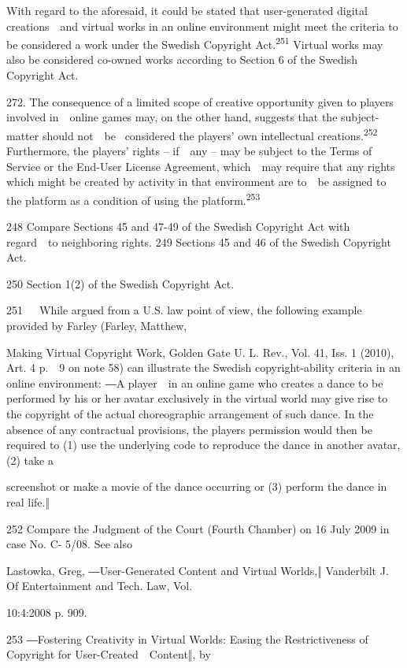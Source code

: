 \documentclass[
]{article}
\begin{document}
{With regard to the aforesaid, it could be stated that user-generated
digital creations~~and virtual works in an online environment might meet
the criteria to be considered a work under the Swedish }{Copyright
Act}{.}\textsuperscript{{251 }}{Virtual works may also be considered
co-owned works according to Section 6 of the Swedish }{Copyright Act}{.}

{272. }{The consequence of a limited scope of creative opportunity given
to players involved in~~online games may, on the other hand, suggests
that the subject-matter should not~~be }{~considered the players' own
intellectual creations.}\textsuperscript{{252 }}{Furthermore, the
players' rights -- }{if~~any }{-- }{may be subject to the Terms of
Service or the End-User License Agreement, which~~may require that any
rights which might be created by activity in that environment are to~~be
assigned to the platform as a condition of using the
platform.}\textsuperscript{{253}}

{248 }{Compare Sections 45 and 47-49 of the Swedish }{Copyright Act
}{with regard~~to neighboring rights. }{249 }{Sections 45 and 46 of the
Swedish }{Copyright Act.}

{250 }{Section 1(2) of the Swedish }{Copyright Act.}

{251}{~~~}{While argued from a U.S. law point of view, the following
example provided by Farley (Farley, Matthew,}

{Making Virtual Copyright Work}{, Golden Gate U. L. Rev., Vol. 41, Iss.
1 (2010), Art. 4 p.~~9 on note 58) can illustrate the Swedish
copyright-}{ability criteria in an online environment: ―}{A player~~in
an online game who creates a dance to be performed by his or her avatar
exclusively in the virtual world may give rise to the copyright of the
actual choreographic arrangement of such dance. In the absence of any
contractual provisions, the players permission would then be required to
(1) use the underlying code to reproduce the dance in another avatar,
(2) take a}

{screenshot or make a movie of the dance occurring or (3) perform the
dance in real life.}{‖}

{252 }{Compare the Judgment of the Court (Fourth Chamber) on 16 July
2009 in case No. C- 5/08. }{See also}

{Lastowka, Greg, }{―}{User-Generated Content and Virtual Worlds,}{‖
}{Vanderbilt J. Of Entertainment and Tech. Law}{, Vol.}

{10:4:2008 p. 909.}

{253 }{―}{Fostering Creativity in Virtual Worlds: Easing the
Restrictiveness of Copyright for User-Created~~Content}{‖, by}
\end{document}
